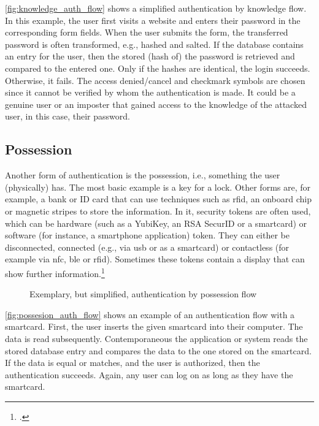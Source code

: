 \autoref{fig:knowledge_auth_flow} shows a simplified authentication by knowledge flow. In this example, the user first visits a website and enters their password in the corresponding form fields. When the user submits the form, the transferred password is often transformed, e.g., hashed and salted. If the database contains an entry for the user, then the stored (hash of) the password is retrieved and compared to the entered one. Only if the hashes are identical, the login succeeds. Otherwise, it fails. The \frqq access denied/cancel\flqq{} and \frqq checkmark\flqq{} symbols are chosen since it cannot be verified by whom the authentication is made. It could be a genuine user or an imposter that gained access to the knowledge of the attacked user, in this case, their password.

\subsection{Possession}

Another form of authentication is the possession, i.e., \frqq something the user (physically) has\flqq{}. The most basic example is a key for a lock. Other forms are, for example, a bank or ID card that can use techniques such as \gls{rfid}, an onboard chip or magnetic stripes to store the information. In \gls{it}, security tokens are often used, which can be hardware (such as a YubiKey, an RSA SecurID or a smartcard) or software (for instance, a smartphone application) token. They can either be disconnected, connected (e.g., via \gls{usb} or as a smartcard) or contactless (for example via \gls{nfc}, \gls{ble} or \gls{rfid}). Sometimes these tokens contain a display that can show further information.\footcites[See][24]{265831}[See][]{Dressel:2019:SZT:3319499.3328225}[See][8--11]{Mayes2017}

\begin{figure}[hbt]
	\centering
	
	\caption[Exemplary, but simplified, authentication by possession flow]{Exemplary, but simplified, authentication by possession flow\footnotemark}
	\label{fig:possesion_auth_flow}
\end{figure}

\autoref{fig:possesion_auth_flow} shows an example of an authentication flow with a smartcard. First, the user inserts the given smartcard into their computer. The data is read subsequently. Contemporaneous the application or system reads the stored database entry and compares the data to the one stored on the smartcard. If the data is equal or matches, and the user is authorized, then the authentication succeeds. Again, any user can log on as long as they have the smartcard.


